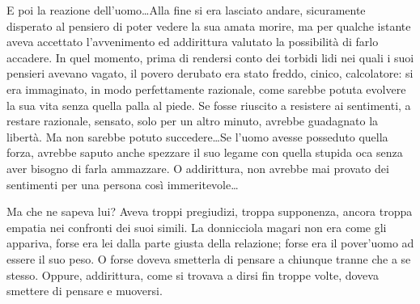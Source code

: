 E poi la reazione dell'uomo\ldots Alla fine si era lasciato andare, sicuramente disperato al pensiero di poter vedere la sua amata morire, ma per qualche istante aveva accettato l'avvenimento ed addirittura valutato la possibilità di farlo accadere. In quel momento, prima di rendersi conto dei torbidi lidi nei quali i suoi pensieri avevano vagato, il povero derubato era stato freddo, cinico, calcolatore: si era immaginato, in modo perfettamente razionale, come sarebbe potuta evolvere la sua vita senza quella palla al piede. Se fosse riuscito a resistere ai sentimenti, a restare razionale, sensato, solo per un altro minuto, avrebbe guadagnato la libertà. Ma non sarebbe potuto succedere\ldots Se l'uomo avesse posseduto quella forza, avrebbe saputo anche spezzare il suo legame con quella stupida oca senza aver bisogno di farla ammazzare. O addirittura, non avrebbe mai provato dei sentimenti per una persona così immeritevole\ldots

Ma che ne sapeva lui? Aveva troppi pregiudizi, troppa supponenza, ancora troppa empatia nei confronti dei suoi simili. La donnicciola magari non era come gli appariva, forse era lei dalla parte giusta della relazione; forse era il pover'uomo ad essere il suo peso. O forse doveva smetterla di pensare a chiunque tranne che a se stesso. Oppure, addirittura, come si trovava a dirsi fin troppe volte, doveva smettere di pensare e muoversi.
